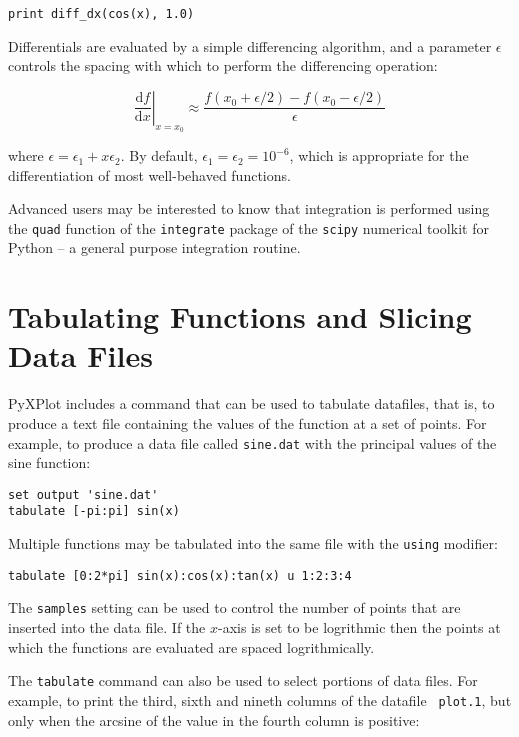 \documentclass[a4paper,onecolumn,11pt]{book}
\begin{document}
\begin{verbatim}
print diff_dx(cos(x), 1.0)
\end{verbatim}

Differentials are evaluated by a simple differencing algorithm, and a parameter
$\epsilon$ controls the spacing with which to perform the differencing
operation:

\begin{displaymath}
\left.\frac{\mathrm{d}f}{\mathrm{d}x}\right|_{x=x_0} \approx \frac{f(x_0+\epsilon/2) - f(x_0-\epsilon/2)}{\epsilon}
\end{displaymath}

\noindent where $\epsilon = \epsilon_1 + x \epsilon_2$. By default, $\epsilon_1
= \epsilon_2 = 10^{-6}$, which is appropriate for the differentiation of most
well-behaved functions.

Advanced users may be interested to know that integration is performed using
the \texttt{quad} function of the \texttt{integrate} package of the
\texttt{scipy} numerical toolkit for Python -- a general purpose integration
routine.

\section{Tabulating Functions and Slicing Data Files}

PyXPlot includes a command that can be used to tabulate datafiles, that is, to
produce a text file containing the values of the function at a set of points.
For example, to produce a data file called {\tt sine.dat} with the principal
values of the sine function:

\begin{verbatim}
set output 'sine.dat'
tabulate [-pi:pi] sin(x)
\end{verbatim}

Multiple functions may be tabulated into the same file with the {\tt using}
modifier:

\begin{verbatim}
tabulate [0:2*pi] sin(x):cos(x):tan(x) u 1:2:3:4
\end{verbatim}

The {\tt samples} setting can be used to control the number of points that are
inserted into the data file.  If the $x$-axis is set to be logrithmic then the
points at which the functions are evaluated are spaced logrithmically.

The {\tt tabulate} command can also be used to select portions of data files.
For example, to print the third, sixth and nineth columns of the datafile {\tt
plot.1}, but only when the arcsine of the value in the fourth column is
positive:
\end{document}
